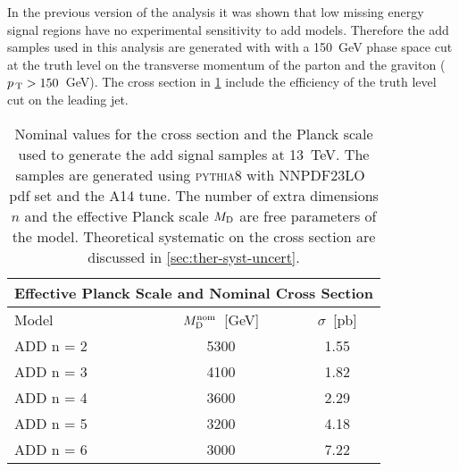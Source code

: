 In the previous version of the analysis it was shown that low missing energy
signal regions have no experimental sensitivity to \gls{add} models. Therefore
the \gls{add} samples used in this analysis are generated with with a 150~GeV
phase space cut at the truth level on the transverse momentum of the parton and
the graviton ($p_\mathrm{\, T} > 150$~GeV). The cross section in \cref{tab:sigma_md_ref}
include the efficiency of the truth level cut on the leading jet.
\begin{table}[!htb]
  \centering
  \begin{tabular}{lcc}
    \toprule
    \multicolumn{3}{c}{Effective Planck Scale and Nominal Cross Section} \\
    \midrule \midrule
    Model & $M_\mathrm{D}^\mathrm{nom}$~[GeV] & $\sigma$~[pb] \\
    \midrule
    ADD n = 2 & 5300 & 1.55 \\
    ADD n = 3 & 4100 & 1.82 \\
    ADD n = 4 & 3600 & 2.29 \\
    ADD n = 5 & 3200 & 4.18 \\
    ADD n = 6 & 3000 & 7.22 \\
    \bottomrule
  \end{tabular}
  \caption{Nominal values for the cross section and the Planck scale used to
    generate the \gls{add} signal samples at 13~TeV. The samples are generated
    using \textsc{pythia8} with NNPDF23LO~\cite{NNPDF23LO} \gls{pdf} set and the
    A14 tune. The number of extra dimensions $n$ and the effective Planck scale
    $M_\mathrm{D}$ are free parameters of the model. Theoretical systematic on the cross
    section are discussed in \cref{sec:ther-syst-uncert}.}
  \label{tab:sigma_md_ref}
\end{table}
\pagebreak[4]
